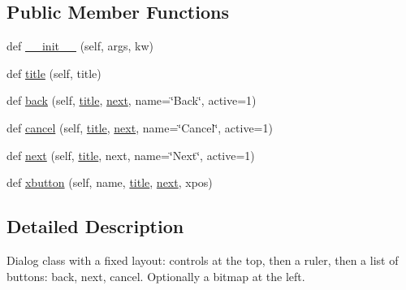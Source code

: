 \subsection*{Public Member Functions}
\begin{DoxyCompactItemize}
\item 
def \hyperlink{classsetuptools_1_1__distutils_1_1command_1_1bdist__msi_1_1PyDialog_aaf5c0c61a56dcd8f8e1b572a8234506b}{\+\_\+\+\_\+init\+\_\+\+\_\+} (self, args, kw)
\item 
def \hyperlink{classsetuptools_1_1__distutils_1_1command_1_1bdist__msi_1_1PyDialog_afd4e5f519d41b9339a54931a77e797c3}{title} (self, title)
\item 
def \hyperlink{classsetuptools_1_1__distutils_1_1command_1_1bdist__msi_1_1PyDialog_a41f947ea05a75c1704a4199d4d705870}{back} (self, \hyperlink{classsetuptools_1_1__distutils_1_1command_1_1bdist__msi_1_1PyDialog_afd4e5f519d41b9339a54931a77e797c3}{title}, \hyperlink{classsetuptools_1_1__distutils_1_1command_1_1bdist__msi_1_1PyDialog_a1efb0f524d983d5542c03b42c60fc2a5}{next}, name=\char`\"{}Back\char`\"{}, active=1)
\item 
def \hyperlink{classsetuptools_1_1__distutils_1_1command_1_1bdist__msi_1_1PyDialog_a78cdce01f7544185cb934b0fe84ff078}{cancel} (self, \hyperlink{classsetuptools_1_1__distutils_1_1command_1_1bdist__msi_1_1PyDialog_afd4e5f519d41b9339a54931a77e797c3}{title}, \hyperlink{classsetuptools_1_1__distutils_1_1command_1_1bdist__msi_1_1PyDialog_a1efb0f524d983d5542c03b42c60fc2a5}{next}, name=\char`\"{}Cancel\char`\"{}, active=1)
\item 
def \hyperlink{classsetuptools_1_1__distutils_1_1command_1_1bdist__msi_1_1PyDialog_a1efb0f524d983d5542c03b42c60fc2a5}{next} (self, \hyperlink{classsetuptools_1_1__distutils_1_1command_1_1bdist__msi_1_1PyDialog_afd4e5f519d41b9339a54931a77e797c3}{title}, next, name=\char`\"{}Next\char`\"{}, active=1)
\item 
def \hyperlink{classsetuptools_1_1__distutils_1_1command_1_1bdist__msi_1_1PyDialog_ae02f93634b3b0bfed34c7ea3e4e324b1}{xbutton} (self, name, \hyperlink{classsetuptools_1_1__distutils_1_1command_1_1bdist__msi_1_1PyDialog_afd4e5f519d41b9339a54931a77e797c3}{title}, \hyperlink{classsetuptools_1_1__distutils_1_1command_1_1bdist__msi_1_1PyDialog_a1efb0f524d983d5542c03b42c60fc2a5}{next}, xpos)
\end{DoxyCompactItemize}


\subsection{Detailed Description}
\begin{DoxyVerb}Dialog class with a fixed layout: controls at the top, then a ruler,
then a list of buttons: back, next, cancel. Optionally a bitmap at the
left.\end{DoxyVerb}
 

